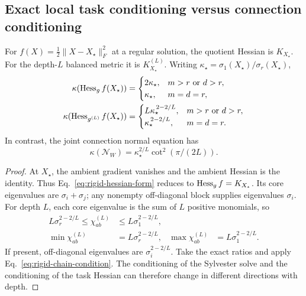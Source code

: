 \subsection{Exact local task conditioning versus connection conditioning}
\begin{theorem}
\label{thm:local-reconstruction-conditioning}
For $f(X)=\tfrac12\|X-X_\star\|_F^2$ at a regular solution,
the quotient Hessian is $K_{X_\star}$.
For the depth-$L$ balanced metric it is $K_{X_\star}^{(L)}$.
Writing $\kappa_\star=\sigma_1(X_\star)/\sigma_r(X_\star)$,
\begin{align}
\kappa(\operatorname{Hess}_g f(X_\star))
&=\begin{cases}
2\kappa_\star,&m>r\text{ or }d>r,\\
\kappa_\star,&m=d=r,
\end{cases}\\
\kappa(\operatorname{Hess}_{g^{(L)}}f(X_\star))
&=\begin{cases}
L\kappa_\star^{\,2-2/L},&m>r\text{ or }d>r,\\
\kappa_\star^{\,2-2/L},&m=d=r .
\end{cases}
\label{eq:local-reconstruction-conditioning}
\end{align}
In contrast, the joint connection normal equation has
\begin{equation}
\kappa(\mathcal N_W)
=\kappa_\star^{2/L}\cot^2(\pi/(2L)).
\end{equation}
\end{theorem}
\begin{proof}
At $X_\star$, the ambient gradient vanishes and the ambient Hessian
is the identity. Thus Eq.~\eqref{eq:rigid-hessian-form} reduces to
$\operatorname{Hess}_g f=K_{X_\star}$.
Its core eigenvalues are $\sigma_i+\sigma_j$; any nonempty
off-diagonal block supplies eigenvalues $\sigma_i$.
For depth $L$, each core eigenvalue is the sum of $L$ positive
monomials, so
\begin{align}
L\sigma_r^{2-2/L}\leq\chi_{ab}^{(L)}
&\leq L\sigma_1^{2-2/L},\\
\min\chi_{ab}^{(L)}&=L\sigma_r^{2-2/L},&
\max\chi_{ab}^{(L)}&=L\sigma_1^{2-2/L}.
\end{align}
If present, off-diagonal eigenvalues are
$\sigma_i^{2-2/L}$. Take the exact ratios and apply
Eq.~\eqref{eq:rigid-chain-condition}.
The conditioning of the Sylvester solve and the conditioning of the
task Hessian can therefore change in different directions with depth.
\end{proof}
